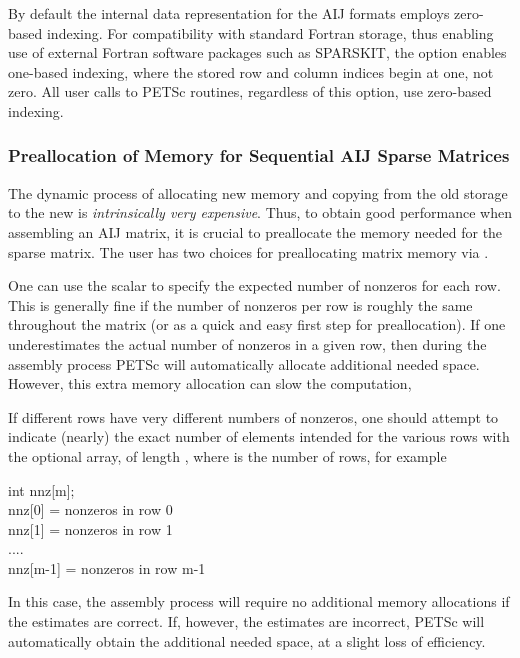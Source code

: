By default the internal data representation for the AIJ formats employs
zero-based indexing.  For compatibility with standard Fortran storage,
thus enabling use of external Fortran software packages such as
SPARSKIT,  the option 
 enables one-based indexing, where the stored
row and column indices begin at one, not zero.  All user calls to
PETSc routines, regardless of this option, use zero-based indexing.

\subsubsection{Preallocation of Memory for Sequential AIJ Sparse Matrices}

The dynamic process of allocating new memory and copying from the old
storage to the new is {\em intrinsically very expensive}.  Thus, to
obtain good performance when assembling an AIJ matrix, it is crucial
to preallocate the memory needed for the sparse matrix.  The user has
two choices for preallocating matrix memory via . 

One can use the scalar  to specify the expected
number of nonzeros for each row.  This is generally fine if the number
of nonzeros per row is roughly the same throughout the matrix (or as a
quick and easy first step for preallocation).  If one underestimates
the actual number of nonzeros in a given row, then during the assembly
process PETSc will automatically allocate additional needed space.
However, this extra memory allocation can slow the computation,

If different rows have very different numbers of nonzeros, one
should attempt to indicate (nearly) the exact number of elements
intended for the various rows with the optional array,  of
length , where  is the number of rows, for example
\begin{tabbing}
   int nnz[m];\\
   nnz[0] = \trl{<}nonzeros in row 0\trl{>}\\
   nnz[1] = \trl{<}nonzeros in row 1\trl{>}\\
   ....\\
   nnz[m-1] = \trl{<}nonzeros in row m-1\trl{>}
\end{tabbing}
In this case, the assembly process will require no additional memory
allocations if the  estimates are correct. If, however,
the  estimates are incorrect, PETSc will automatically
obtain the additional needed space, at a slight loss of efficiency.

